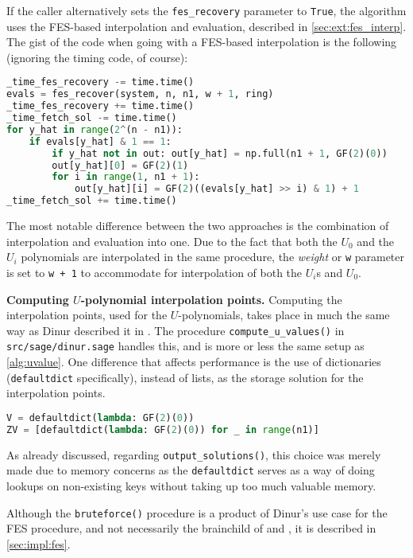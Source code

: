 If the caller alternatively sets the \texttt{fes\_recovery} parameter to \texttt{True}, the algorithm uses the FES-based interpolation and evaluation, described in \cref{sec:ext:fes_interp}. The gist of the code when going with a FES-based interpolation is the following (ignoring the timing code, of course):
\begin{lstlisting}[language=Python,style=mystyle]
_time_fes_recovery -= time.time()
evals = fes_recover(system, n, n1, w + 1, ring)
_time_fes_recovery += time.time()
_time_fetch_sol -= time.time()
for y_hat in range(2^(n - n1)):
    if evals[y_hat] & 1 == 1:
        if y_hat not in out: out[y_hat] = np.full(n1 + 1, GF(2)(0))
        out[y_hat][0] = GF(2)(1)
        for i in range(1, n1 + 1):
            out[y_hat][i] = GF(2)((evals[y_hat] >> i) & 1) + 1
_time_fetch_sol += time.time()
\end{lstlisting}
The most notable difference between the two approaches is the combination of interpolation and evaluation into one. Due to the fact that both the $U_0$ and the $U_i$ polynomials are interpolated in the same procedure, the \textit{weight} or \texttt{w} parameter is set to \texttt{w + 1} to accommodate for interpolation of both the $U_i$s and $U_0$.

\textbf{Computing $U$-polynomial interpolation points.} Computing the interpolation points, used for the $U$-polynomials, takes place in much the same way as Dinur described it in \cite{cryptoeprint:2021/578}. The procedure \texttt{compute\_u\_values()} in \texttt{src/sage/dinur.sage} handles this, and is more or less the same setup as \cref{alg:uvalue}. One difference that affects performance is the use of dictionaries (\texttt{defaultdict} specifically), instead of lists, as the storage solution for the interpolation points. 
\begin{lstlisting}[language=Python,style=mystyle]
V = defaultdict(lambda: GF(2)(0))
ZV = [defaultdict(lambda: GF(2)(0)) for _ in range(n1)]
\end{lstlisting}
As already discussed, regarding \texttt{output\_solutions()}, this choice was merely made due to memory concerns as the \texttt{defaultdict} serves as a way of doing lookups on non-existing keys without taking up too much valuable memory.

Although the \texttt{bruteforce()} procedure is a product of Dinur's use case for the FES procedure, and not necessarily the brainchild of \cite{cryptoeprint:2013/436} and \cite{cryptoeprint:2010/313}, it is described in \cref{sec:impl:fes}.

